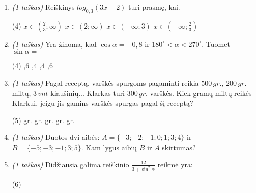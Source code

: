 \documentclass[a4paper]{article}
\begin{document}
\begin{enumerate}
      \item \textit{(1 taškas)} Reiškinys $log_{0,3}(3x-2)$ turi prasmę, kai.
            \begin{tasks}[item-format={\normalfont}, after-item-skip=2mm,
                        label=\Alph*, label-format={\bfseries}](4)
                  \task $x\in(\frac{2}{3};\infty)$
                  \task $x\in(2;\infty)$
                  \task $x\in(-\infty;3)$
                  \task $x\in(-\infty;\frac{2}{3})$
            \end{tasks}
      \item \textit{(1 taškas)} Yra žinoma, kad $\cos\alpha=-0,8$ ir
            $180^\circ<\alpha<270^\circ$. Tuomet $\sin\alpha=$
            \begin{tasks}[item-format={\normalfont}, after-item-skip=2mm,
                        label=\Alph*, label-format={\bfseries}](4)
                  ,6
                  ,4
                  ,4
                  ,6
            \end{tasks}
      \item \textit{(1 taškas)} Pagal receptą, varškės spurgoms pagaminti
            reikia $500\,gr.$, $200\,gr.$ miltų, $3\,vnt$ kiaušinių... Klarkas
            turi $300\,gr.$
            varškės. Kiek gramų miltų reikės Klarkui, jeigu jis gamins varškės
            spurgas pagal šį receptą?
            \begin{tasks}[item-format={\normalfont}, after-item-skip=2mm,
                        label=\Alph*, label-format={\bfseries}](5)
                   gr.
                   gr.
                   gr.
                   gr.
                   gr.
            \end{tasks}
      \item \textit{(1 taškas)} Duotos dvi aibės: $A=\{-3;-2;-1;0;1;3;4\}$ ir
            $B=\{-5;-3;-1;3;5\}$. Kam lygus aibių $B$ ir $A$ skirtumas?
            \vspace{7mm}

      \item \textit{(1 taškas)} Didžiausia galima reiškinio
            $\frac{12}{3+\sin^2\alpha}$ reikmė yra:
            \begin{tasks}[item-format={\normalfont}, after-item-skip=2mm,
                        label=\Alph*, label-format={\bfseries}](6)
            \end{tasks}


\end{enumerate}
\end{document}
